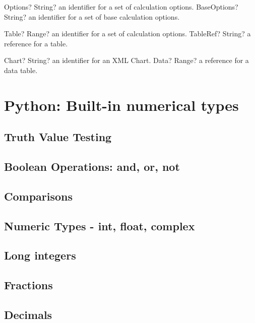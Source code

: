 \documentclass[12pt,a4paper,openany]{book}
\begin{document}
\begin{mpFunctionsExtract}
\mpFunctionOne
{Options? String?  an identifier for a set of calculation options.}
{BaseOptions? String? an identifier for a set of base calculation options.}
\end{mpFunctionsExtract}

\begin{mpFunctionsExtract}
\mpFunctionOne
{Table? Range?  an identifier for a set of calculation options.}
{TableRef? String? a reference for a table.}
\end{mpFunctionsExtract}

\begin{mpFunctionsExtract}
\mpFunctionOne
{Chart? String?  an identifier for an XML Chart.}
{Data? Range? a reference for a data table.}
\end{mpFunctionsExtract}

\chapter{Python: Built-in numerical types}

\section{Truth Value Testing}

\section{Boolean Operations: and, or, not}

\section{Comparisons}

\section{Numeric Types - int, float, complex}

\section{Long integers}

\section{Fractions}

\section{Decimals}
\end{document}
